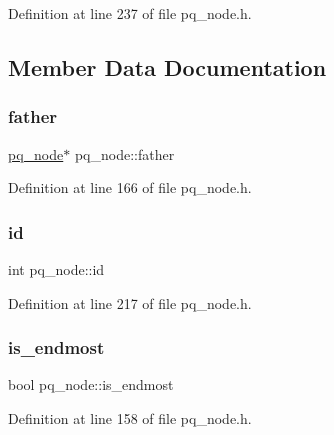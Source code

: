 Definition at line 237 of file pq\+\_\+node.\+h.



\subsection{Member Data Documentation}
\mbox{\label{classpq__node_a3e7c886498c76c633f057fb42ff9c435}} 
\subsubsection{\texorpdfstring{father}{father}}
{\footnotesize\ttfamily \mbox{\hyperlink{classpq__node}{pq\+\_\+node}}$\ast$ pq\+\_\+node\+::father\hspace{0.3cm}{\ttfamily [protected]}}



Definition at line 166 of file pq\+\_\+node.\+h.

\mbox{\label{classpq__node_ad0034c1f93c3c77edb6d3a03f25aba06}} 
\subsubsection{\texorpdfstring{id}{id}}
{\footnotesize\ttfamily int pq\+\_\+node\+::id\hspace{0.3cm}{\ttfamily [protected]}}



Definition at line 217 of file pq\+\_\+node.\+h.

\mbox{\label{classpq__node_a058dda3d1197dfd2b343d1983d305d79}} 
\subsubsection{\texorpdfstring{is\+\_\+endmost}{is\_endmost}}
{\footnotesize\ttfamily bool pq\+\_\+node\+::is\+\_\+endmost\hspace{0.3cm}{\ttfamily [protected]}}



Definition at line 158 of file pq\+\_\+node.\+h.

